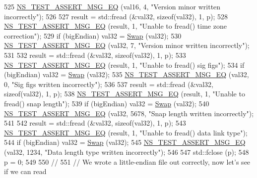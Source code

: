 \begin{DoxyCode}
525   \hyperlink{group__testing_ga2a9d78cffb3db8e867c35fff0b698cf5}{NS\_TEST\_ASSERT\_MSG\_EQ} (val16, 4, \textcolor{stringliteral}{"Version minor written incorrectly"});
526 
527   result = std::fread (&val32, \textcolor{keyword}{sizeof}(val32), 1, p);
528   \hyperlink{group__testing_ga2a9d78cffb3db8e867c35fff0b698cf5}{NS\_TEST\_ASSERT\_MSG\_EQ} (result, 1, \textcolor{stringliteral}{"Unable to fread() time zone correction"});
529   \textcolor{keywordflow}{if} (bigEndian) val32 = \hyperlink{pcap-file-test-suite_8cc_a9baeceaeb66adfc7bddae33a81ad8fa7}{Swap} (val32);
530   \hyperlink{group__testing_ga2a9d78cffb3db8e867c35fff0b698cf5}{NS\_TEST\_ASSERT\_MSG\_EQ} (val32, 7, \textcolor{stringliteral}{"Version minor written incorrectly"});
531 
532   result = std::fread (&val32, \textcolor{keyword}{sizeof}(val32), 1, p);
533   \hyperlink{group__testing_ga2a9d78cffb3db8e867c35fff0b698cf5}{NS\_TEST\_ASSERT\_MSG\_EQ} (result, 1, \textcolor{stringliteral}{"Unable to fread() sig figs"});
534   \textcolor{keywordflow}{if} (bigEndian) val32 = \hyperlink{pcap-file-test-suite_8cc_a9baeceaeb66adfc7bddae33a81ad8fa7}{Swap} (val32);
535   \hyperlink{group__testing_ga2a9d78cffb3db8e867c35fff0b698cf5}{NS\_TEST\_ASSERT\_MSG\_EQ} (val32, 0, \textcolor{stringliteral}{"Sig figs written incorrectly"});
536 
537   result = std::fread (&val32, \textcolor{keyword}{sizeof}(val32), 1, p);
538   \hyperlink{group__testing_ga2a9d78cffb3db8e867c35fff0b698cf5}{NS\_TEST\_ASSERT\_MSG\_EQ} (result, 1, \textcolor{stringliteral}{"Unable to fread() snap length"});
539   \textcolor{keywordflow}{if} (bigEndian) val32 = \hyperlink{pcap-file-test-suite_8cc_a9baeceaeb66adfc7bddae33a81ad8fa7}{Swap} (val32);
540   \hyperlink{group__testing_ga2a9d78cffb3db8e867c35fff0b698cf5}{NS\_TEST\_ASSERT\_MSG\_EQ} (val32, 5678, \textcolor{stringliteral}{"Snap length written incorrectly"});
541 
542   result = std::fread (&val32, \textcolor{keyword}{sizeof}(val32), 1, p);
543   \hyperlink{group__testing_ga2a9d78cffb3db8e867c35fff0b698cf5}{NS\_TEST\_ASSERT\_MSG\_EQ} (result, 1, \textcolor{stringliteral}{"Unable to fread() data link type"});
544   \textcolor{keywordflow}{if} (bigEndian) val32 = \hyperlink{pcap-file-test-suite_8cc_a9baeceaeb66adfc7bddae33a81ad8fa7}{Swap} (val32);
545   \hyperlink{group__testing_ga2a9d78cffb3db8e867c35fff0b698cf5}{NS\_TEST\_ASSERT\_MSG\_EQ} (val32, 1234, \textcolor{stringliteral}{"Data length type written incorrectly"});
546 
547   std::fclose (p);
548   p = 0;
549 
550   \textcolor{comment}{//}
551   \textcolor{comment}{// We wrote a little-endian file out correctly, now let's see if we can read}

\end{DoxyCode}
